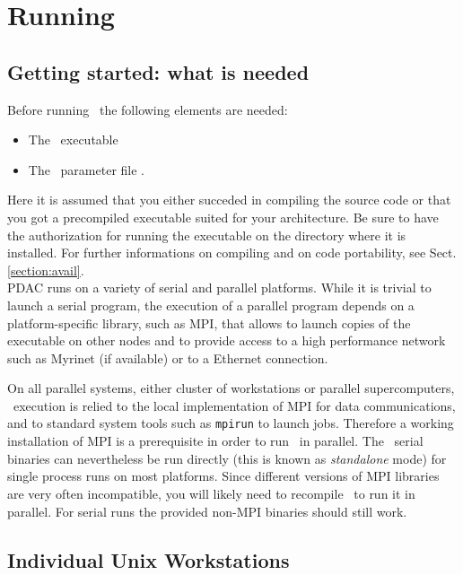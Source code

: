 \section{Running \PDAC}
\label{section:run}

\subsection{Getting started: what is needed}

Before running \PDAC\ the following elements are needed:
\begin{itemize}
\item The \PDAC\ executable 
\item The \PDAC\ parameter file .
\end{itemize}

Here it is assumed that you either succeded in compiling the source
code or that you got a precompiled executable suited for your architecture.
Be sure to have the authorization for running the executable on the
directory where it is installed. For further informations on compiling and 
on code portability, see Sect. \ref{section:avail}.\\

PDAC runs on a variety of serial and parallel platforms.  While it is
trivial to launch a serial program, the execution of a parallel program 
depends on a platform-specific library, such as MPI, that allows to launch 
copies of the executable on other nodes and to provide access to a high 
performance network such as Myrinet (if available) or to a Ethernet connection.

On all parallel systems, either cluster of workstations or parallel 
supercomputers, \PDAC\ execution is relied to the local implementation
of MPI for data communications, and to standard system tools such as
{\tt mpirun} to launch jobs. Therefore a working installation of MPI is a 
prerequisite in order to run \PDAC\ in parallel.
The \PDAC\ serial binaries can nevertheless be run directly (this is known 
as {\it standalone} mode) for single process runs on most platforms.
Since different versions of MPI libraries are very often incompatible, you will 
likely need to recompile \PDAC\ to run it in parallel. For serial runs
the provided non-MPI binaries should still work.

\subsection{Individual Unix Workstations}

